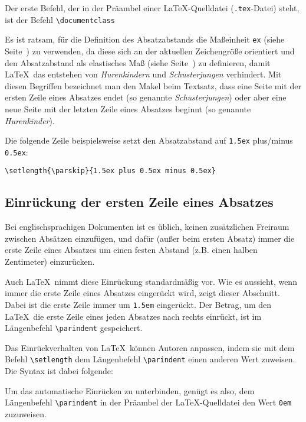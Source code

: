 Der erste Befehl, der in der Präambel einer \LaTeX-Quelldatei (\verb!.tex!-Datei) steht, ist der Befehl \verb!\documentclass!
\begin{document}
Es ist ratsam, für die Definition des Absatzabstands die Maßeinheit \verb!ex! (siehe Seite~\pageref{Tabelle_Masseinheiten}) zu verwenden, da diese sich an der aktuellen Zeichengröße orientiert und den
Absatzabstand als elastisches Maß (siehe Seite~\pageref{Elastische_Masse}) zu definieren, damit \LaTeX\ das entstehen von 
\textsl{Hurenkindern} und \textsl{Schusterjungen} verhindert. Mit diesen Begriffen bezeichnet man den Makel beim Textsatz, dass eine Seite mit der ersten Zeile eines 
Absatzes endet (so genannte \textsl{Schusterjungen}) oder aber eine neue 
Seite mit der letzten Zeile eines Absatzes beginnt (so genannte
\textsl{Hurenkinder}).

Die folgende Zeile beispielsweise setzt den Absatzabstand
auf \verb!1.5ex! plus/minus \verb!0.5ex!:

\begin{Verbatim}[frame=single]
\setlength{\parskip}{1.5ex plus 0.5ex minus 0.5ex}
\end{Verbatim}




\subsection{Einrückung der ersten Zeile eines Absatzes}


\setlength{\parindent}{1.5em}
Bei englischsprachigen Dokumenten ist es üblich, keinen zusätzlichen Freiraum zwischen Absätzen einzufügen, und dafür (außer beim ersten Absatz) immer die erste Zeile eines Absatzes um einen festen Abstand (z.B. einen halben Zentimeter) einzurücken.

Auch \LaTeX\ nimmt diese Einrückung
standardmäßig vor. Wie es aussieht, wenn immer die erste 
Zeile eines Absatzes eingerückt wird, zeigt dieser Abschnitt. 
Dabei ist die erste Zeile immer um \verb!1.5em! eingerückt.
Der Betrag, um den \LaTeX\ die erste 
Zeile eines jeden Absatzes nach rechts 
einrückt, ist im Längenbefehl \verb!\parindent!
 gespeichert.

Das Einrückverhalten von \LaTeX\ können Autoren anpassen, indem sie mit
dem Befehl \verb!\setlength! dem
Längenbefehl \verb!\parindent!
einen anderen
Wert zuweisen. Die Syntax ist dabei folgende:



Um das automatische
Einrücken zu unterbinden, genügt es also, dem Längenbefehl \verb!\parindent! in der Präambel der \LaTeX-Quelldatei den Wert \verb!0em! zuzuweisen.
\end{document}
